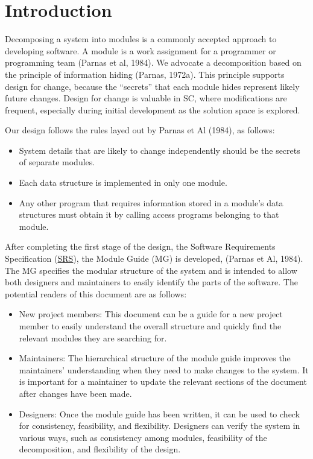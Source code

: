 \documentclass[12pt, titlepage]{article}
\begin{document}
\newpage

\tableofcontents

\listoftables

\listoffigures

\newpage


\section{Introduction}

Decomposing a system into modules is a commonly accepted approach to developing
software.  A module is a work assignment for a programmer or programming
team (Parnas et al, 1984).  We advocate a decomposition
based on the principle of information hiding (Parnas, 1972a).  This
principle supports design for change, because the ``secrets'' that each module
hides represent likely future changes.  Design for change is valuable in SC,
where modifications are frequent, especially during initial development as the
solution space is explored.  

Our design follows the rules layed out by Parnas et Al (1984), as follows:
\begin{itemize}
\item System details that are likely to change independently should be the
  secrets of separate modules.
\item Each data structure is implemented in only one module.
\item Any other program that requires information stored in a module's data
  structures must obtain it by calling access programs belonging to that module.
\end{itemize}

After completing the first stage of the design, the Software Requirements
Specification (\href{https://github.com/NevoAbigail/Capstone/blob/main/docs/SRS/SRS.pdf}{SRS}), the Module Guide (MG) is developed, (Parnas et Al, 1984). The MG
specifies the modular structure of the system and is intended to allow both
designers and maintainers to easily identify the parts of the software.  The
potential readers of this document are as follows:

\begin{itemize}
\item New project members: This document can be a guide for a new project member
  to easily understand the overall structure and quickly find the
  relevant modules they are searching for.
\item Maintainers: The hierarchical structure of the module guide improves the
  maintainers' understanding when they need to make changes to the system. It is
  important for a maintainer to update the relevant sections of the document
  after changes have been made.
\item Designers: Once the module guide has been written, it can be used to
  check for consistency, feasibility, and flexibility. Designers can verify the
  system in various ways, such as consistency among modules, feasibility of the
  decomposition, and flexibility of the design.
\end{itemize}
\end{document}
